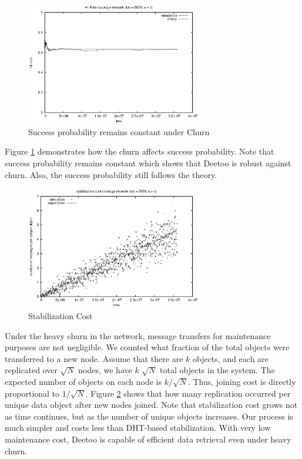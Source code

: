 \documentclass[conference]{IEEEtran}
\begin{document}
\begin{figure}
\centering
\includegraphics[width=3in]{hit_ch}
\caption{Success probability remains constant under Churn} \label{fig:hit_churn}
\end{figure}
Figure \ref{fig:hit_churn} demonstrates how the churn affects success probability.
Note that success probability remains constant which shows that Deetoo is robust against churn. 
Also, the success probability still follows the theory.

\begin{figure}
\centering
\includegraphics[width=3in]{stab_cost}
\caption{Stabilization Cost} \label{fig:stab_cost}
\end{figure}
Under the heavy churn in the network, message transfers for maintenance purposes
are not negligible. 
We counted what fraction of the total objects were transferred to a new node.
Assume that there are $k$ objects, and each are replicated over 
$\sqrt{N}$ nodes, we have $k$ $\sqrt{N}$ total objects in the system.
The expected number of objects on each node is $k/\sqrt{N}$. 
Thus, joining cost is directly proportional to $1/\sqrt{N}$.
Figure \ref{fig:stab_cost} shows that how many replication occurred per unique
data object after new nodes joined. 
Note that stabilization cost grows not as time continues, but as the number of unique 
objects increases.
Our process is much simpler and costs less than DHT-based stabilization.
With very low maintenance cost, Deetoo is capable of efficient data retrieval 
even under heavy churn.
\end{document}
